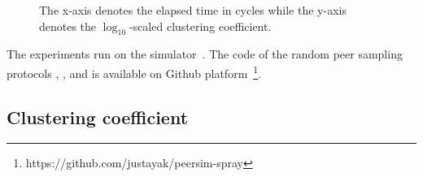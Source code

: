 \begin{figure}
  \centering
  \hspace{10pt}
  \caption{\label{fig:clustering}The x-axis denotes the elapsed time in cycles
    while the y-axis denotes the $\log_{10}$-scaled clustering coefficient.}
\end{figure}


The experiments run on the \PEERSIM
simulator~\cite{montresor2009peersim}. The code of the random peer sampling
protocols \CYCLON, \SCAMP, and \SPRAY is available on Github
platform~\footnote{https://github.com/justayak/peersim-spray}.

\subsection{Clustering coefficient}
\label{subsec:cluster}


